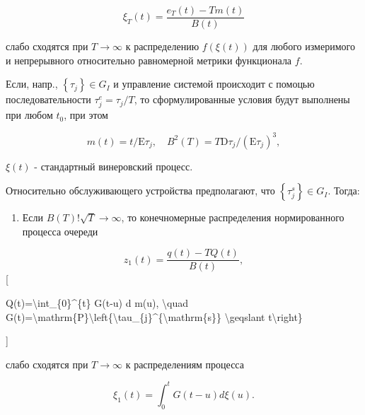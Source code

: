 \documentclass[10pt]{article}
\begin{document}
\[

\xi_{T}(t)=\frac{e_{T}(t)-T m(t)}{B(t)}

\]



слабо сходятся при $T \rightarrow \infty$ к распределению $f(\xi(t))$ для любого измеримого и непрерывного относительно равномерной метрики функционала $f$.



Если, напр., $\left\{\tau_{j}\right\} \in G_{I}$ и управление системой происходит с помоцью последовательности $\tau_{j}^{e}=\tau_{j} / T$, то сформулированные условия будут выполнены при любом $t_{0}$, при этом



\[

m(t)=t / \mathrm{E} \tau_{j}, \quad B^{2}(T)=T \mathrm{D} \tau_{j} /\left(\mathrm{E} \tau_{j}\right)^{3},

\]



$\xi(t)$ - стандартный винеровский процесс.



Относительно обслуживающего устройства предполагают, что $\left\{\tau_{j}^{s}\right\} \in G_{I}$. Тогда:



\begin{enumerate}

  \item Если $B(T) ! \sqrt{T} \rightarrow \infty$, то конечномерные распределения нормированного процесса очереди

\end{enumerate}



\[

z_{1}(t)=\frac{q(t)-T Q(t)}{B(t)},

\][



Q(t)=\textbackslash int\_\{0\}\^{}\{t\} G(t-u) d m(u), \textbackslash quad G(t)=\textbackslash mathrm\{P\}\textbackslash left\{\textbackslash tau\_\{j\}\^{}\{\textbackslash mathrm\{s\}\} \textbackslash geqslant t\textbackslash right\}

]



слабо сходятся при $T \rightarrow \infty$ к распределениям процесса



\[

\xi_{1}(t)=\int_{0}^{t} G(t-u) d \xi(u) .

\]
\end{document}
